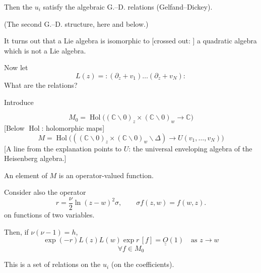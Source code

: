 Then the $u_i$ satisfy the algebraic G.--D.
relations (Gelfand--Dickey).

(The second G.--D. structure, here and below.)

It turns out that a Lie algebra is isomorphic to
[crossed out: ]
a quadratic algebra which is not a Lie algebra.

Now let
\begin{equation*}
L(z)=:(\partial_z+v_1)\ldots(\partial_z+v_N): \tag{22}
\end{equation*}
What are the relations?

Introduce

\begin{equation*}
M_0=\operatorname{Hol}\bigl((\mathbb C\backslash0)_z\times
(\mathbb C\backslash0)_w\longrightarrow\mathbb C\bigr)
\end{equation*}
[Below $\operatorname{Hol}$: holomorphic maps]
\begin{equation*}
M=\operatorname{Hol}\bigl(((\mathbb C\backslash0)_z\times
(\mathbb C\backslash0)_w\backslash\Delta)\longrightarrow U(v_1,\ldots,v_N)\bigr)
\end{equation*}
[A line from the explanation points to $U$: the universal enveloping algebra
of the Heisenberg algebra.]

An element of $M$ is an operator-valued function.

Consider also the operator
\begin{equation*}
r=\frac{\nu}{2}\ln(z-w)^2\sigma,\qquad \sigma f(z,w)=f(w,z).
\end{equation*}
on functions of two variables.


Then, if $\nu(\nu-1)=h$,
\begin{equation*}
\exp(-r)L(z)L(w)\exp r\,[f]=\underline{\underline{O}}(1)
\quad\text{as }z\longrightarrow w \tag{23}
\end{equation*}
\begin{equation*}
\forall f\in M_0
\end{equation*}

This is a set of relations on the $u_i$ (on the coefficients).

